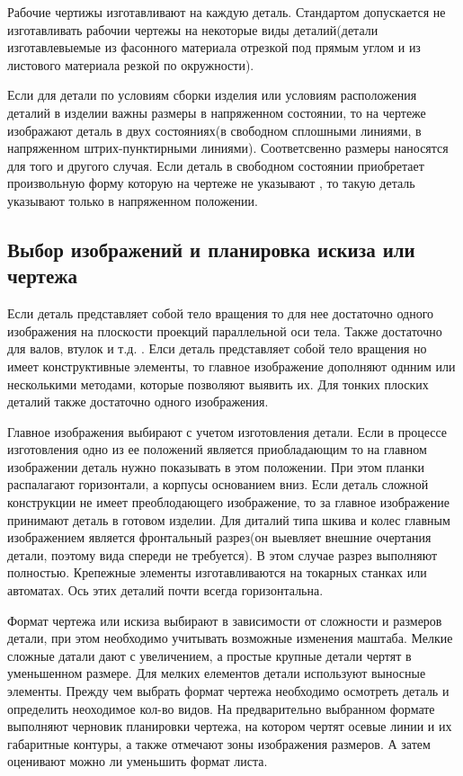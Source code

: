 \documentclass[a4paper, 12pt]{article}
\begin{document}
Рабочие чертижы изготавливают на каждую деталь. Стандартом допускается не изготавливать рабочии чертежы на некоторые виды деталий(детали изготавлевыемые из фасонного материала отрезкой под прямым углом и из листового материала  резкой по окружности).

Если для детали по условиям сборки изделия или условиям расположения деталий в изделии важны размеры в напряженном состоянии, то  на чертеже изображают деталь в двух состояниях(в свободном сплошными линиями, в напряженном штрих-пунктирными линиями). Соответсвенно размеры наносятся для того и другого случая. Если деталь в свободном состоянии приобретает произвольную форму которую на чертеже не указывают , то такую деталь указывают только в напряженном положении.

\subsection{Выбор изображений и планировка искиза или чертежа}
Если деталь представляет собой тело вращения то для нее достаточно одного изображения на плоскости проекций параллельной оси тела. Также достаточно для валов, втулок и т.д. . Елси деталь представляет собой тело вращения но имеет конструктивные элементы, то главное изображение дополняют однним или несколькими методами, которые позволяют выявить их. Для тонких плоских деталий также достаточно одного изображения.

Главное изображения выбирают с учетом изготовления детали. Если в процессе изготовления одно из ее положений является приобладающим то на главном изображении деталь нужно показывать в этом положении. При этом планки распалагают горизонтали, а корпусы основанием вниз. Если деталь сложной конструкции не имеет преоблодающего изображение, то за главное изображение принимают деталь в готовом изделии. Для диталий типа шкива и колес главным изображением является фронтальный разрез(он выевляет внешние очертания детали, поэтому вида спереди не требуется). В этом случае разрез выполняют полностью. Крепежные элементы изготавливаются на токарных станках или автоматах. Ось этих деталий почти всегда горизонтальна.

Формат чертежа или искиза выбирают в зависимости от сложности и размеров детали, при этом необходимо учитывать возможные изменения маштаба. Мелкие сложные датали дают с увеличением, а простые крупные детали чертят в уменьшенном размере. Для мелких елементов детали используют выносные элементы. Прежду чем выбрать формат чертежа необходимо осмотреть деталь и определить неоходимое кол-во видов. На предварительно выбранном формате выполняют черновик планировки чертежа, на котором чертят осевые линии и их габаритные контуры, а также отмечают зоны изображения размеров. А затем оценивают можно ли уменьшить формат листа.
\end{document}
